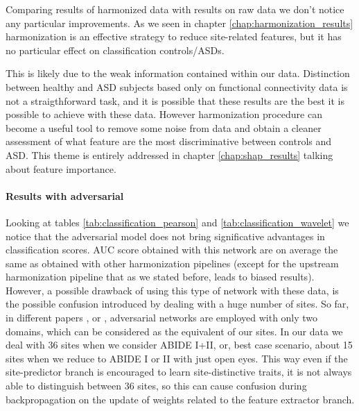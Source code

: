 \documentclass[11pt]{report}
\begin{document}

\hfill

Comparing results of harmonized data with results on raw data we don't notice any particular improvements. 
As we seen in chapter \ref{chap:harmonization_results} harmonization is an effective strategy to reduce site-related features, but it has no particular effect on classification controls/ASDs.

This is likely due to the weak information contained within our data. 
Distinction between healthy and ASD subjects based only on functional connectivity data is not a straigthforward task, and it is possible that these results are the best it is possible to achieve with these data. 
However harmonization procedure can become a useful tool to remove some noise from data and obtain a cleaner assessment of what feature are the most discriminative between controls and ASD. This theme is entirely addressed in chapter \ref{chap:shap_results} talking about feature importance.


\paragraph{Results with adversarial}

\hfill

\noindent Looking at tables \ref{tab:classification_pearson} and \ref{tab:classification_wavelet} we notice that the adversarial model does not bring significative advantages in classification scores. 
AUC score obtained with this network are on average the same as obtained with other harmonization pipelines (except for the upstream harmonization pipeline that as we stated before, leads to biased results).
However, a possible drawback of using this type of network with these data, is the possible confusion introduced by dealing with a huge number of sites.
So far, in different papers \cite{ganin2016}, \cite{kamath2019} or \cite{guan2021},
adversarial networks are employed with only two domains, which can be considered as the equivalent of our sites. 
In our data we deal with 36 sites when we consider ABIDE I+II, or, best case scenario, about 15 sites when we reduce to ABIDE I or II with just open eyes.
This way even if the site-predictor branch is encouraged to learn site-distinctive traits, it is not always able to distinguish between 36 sites, so this can cause confusion during backpropagation on the update of weights related to the feature extractor branch. 
\end{document}
